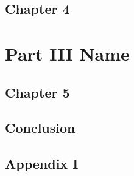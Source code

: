 \documentclass[english, twoside]{book}
\begin{document}
  \chapter{Chapter 4}
  \lipsum

\part{Part III Name}
  \chapter{Chapter 5}
  \lipsum

\chapter{Conclusion} \label{chap:conclusion}

\printbibliography

\newpage \appendix
\chapter{Appendix I} \label{app:A}
\lipsum
\end{document}
